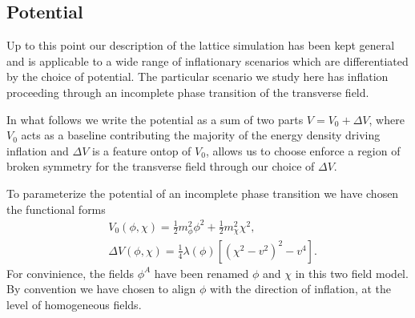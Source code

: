 

\subsection{Potential} \label{sec:potential}
Up to this point our description of the lattice simulation has been kept general and is applicable to a wide range of inflationary scenarios which are differentiated by the choice of potential. The particular scenario we study here has inflation proceeding through an incomplete phase transition of the transverse field. 

In what follows we write the potential as a sum of two parts $V = V_0 + \Delta V$, where $V_0$ acts as a baseline contributing the majority of the energy density driving inflation and $\Delta V$ is a feature ontop of $V_0$, allows us to choose enforce a region of broken symmetry for the transverse field through our choice of $\Delta V$.

To parameterize the potential of an incomplete phase transition we have chosen the functional forms
\begin{align}
  &V_0(\phi,\chi) = \frac{1}{2}m^2_\phi\phi^2 + \frac{1}{2}m^2_\chi\chi^2, \label{eq:V0} \\
  &\Delta V(\phi,\chi) = \frac{1}{4}\lambda(\phi)\left[ (\chi^2-v^2)^2 - v^4 \right]. \label{eq:DeltaV}
\end{align}
For convinience, the fields $\phi^A$ have been renamed $\phi$ and $\chi$ in this two field model. By convention we have chosen to align $\phi$ with the direction of inflation, at the level of homogeneous fields.


